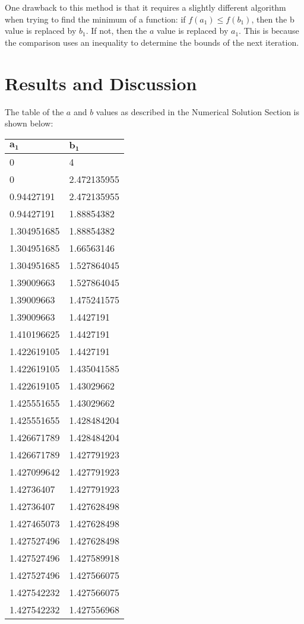 \documentclass[12pt, letterpaper]{article}
\begin{document}
	One drawback to this method is that it requires a slightly different algorithm when trying to find the minimum of a function: if $f(a_1)\leq f(b_1)$, then the b value is replaced by $b_1$. If not, then the $a$ value is replaced by $a_1$. This is because the comparison uses an inequality to determine the bounds of the next iteration.

\newpage
\section{\label{sec:results}Results and Discussion}
    	The table of the $a$ and $b$ values as described in the Numerical Solution Section is shown below:
	
	\begin{table}[h]
	\centering
	\begin{tabular}{|l|l|}
		\hline
		$\mathbf{a_1}$ & $\mathbf{b_1}$ \\ \hline
		0           & 4           \\ \hline
		0           & 2.472135955 \\ \hline
		0.94427191  & 2.472135955 \\ \hline
		0.94427191  & 1.88854382  \\ \hline
		1.304951685 & 1.88854382  \\ \hline
		1.304951685 & 1.66563146  \\ \hline
		1.304951685 & 1.527864045 \\ \hline
		1.39009663  & 1.527864045 \\ \hline
		1.39009663  & 1.475241575 \\ \hline
		1.39009663  & 1.4427191   \\ \hline
		1.410196625 & 1.4427191   \\ \hline
		1.422619105 & 1.4427191   \\ \hline
		1.422619105 & 1.435041585 \\ \hline
		1.422619105 & 1.43029662  \\ \hline
		1.425551655 & 1.43029662  \\ \hline
		1.425551655 & 1.428484204 \\ \hline
		1.426671789 & 1.428484204 \\ \hline
		1.426671789 & 1.427791923 \\ \hline
		1.427099642 & 1.427791923 \\ \hline
		1.42736407  & 1.427791923 \\ \hline
		1.42736407  & 1.427628498 \\ \hline
		1.427465073 & 1.427628498 \\ \hline
		1.427527496 & 1.427628498 \\ \hline
		1.427527496 & 1.427589918 \\ \hline
		1.427527496 & 1.427566075 \\ \hline
		1.427542232 & 1.427566075 \\ \hline
		1.427542232 & 1.427556968 \\ \hline
	\end{tabular}
	\end{table}
	
\end{document}
